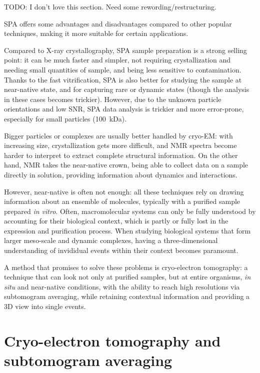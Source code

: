TODO: I don't love this section. Need some rewording/restructuring.

SPA offers some advantages and disadvantages compared to other popular techniques, making it more suitable for certain applications.

Compared to X-ray crystallography, SPA sample preparation is a strong selling point: it can be much faster and simpler, not requiring crystallization and needing small quantities of sample, and being less sensitive to contamination.
Thanks to the fast vitrification, SPA is also better for studying the sample at near-native state, and for capturing rare or dynamic states (though the analysis in these cases becomes trickier).
However, due to the unknown particle orientations and low SNR, SPA data analysis is trickier and more error-prone, especially for small particles (\lesssim\qty{100}{\kilo\dalton}).

Bigger particles or complexes are usually better handled by cryo-EM: with increasing size, crystallization gets more difficult, and NMR spectra become harder to interpret to extract complete structural information.
On the other hand, NMR takes the near-native crown, being able to collect data on a sample directly in solution, providing information about dynamics and interactions.

However, near-native is often not enough: all these techniques rely on drawing information about an ensemble of molecules, typically with a purified sample prepared \textit{in vitro}.
Often, macromolecular systems can only be fully understood by accounting for their biological context, which is partly or fully lost in the expression and purification process.
When studying biological systems that form larger meso-scale and dynamic complexes, having a three-dimensional understanding of invididual events within their context becomes paramount.

A method that promises to solve these problems is cryo-electron tomography: a technique that can look not only at purified samples, but at entire organisms, \textit{in situ} and near-native conditions, with the ability to reach high resolutions via subtomogram averaging, while retaining contextual information and providing a 3D view into single events.


\section[Cryo-ET and STA]{Cryo-electron tomography and subtomogram averaging}

